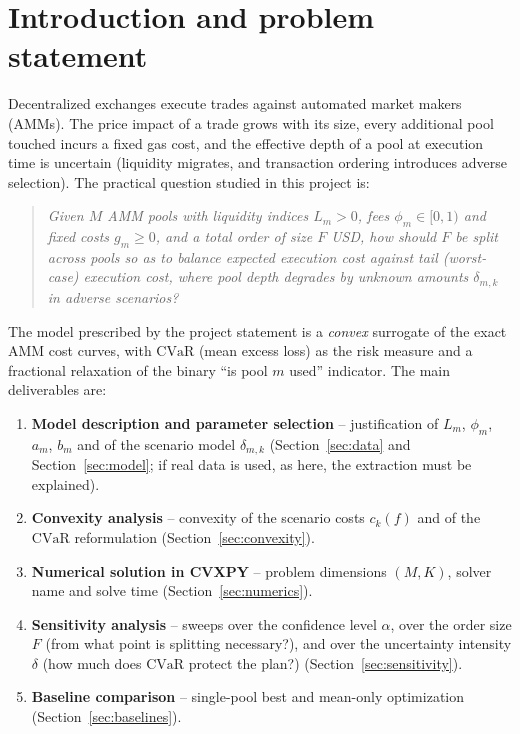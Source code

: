 \documentclass[11pt,a4paper]{article}
\theoremstyle{remark}
\newcommand{\cvar}{\texorpdfstring{\ensuremath{\mathrm{CVaR}}}{CVaR}}
\begin{document}
\tableofcontents
\newpage

\section{Introduction and problem statement}

Decentralized exchanges execute trades against automated market makers (AMMs).  The price
impact of a trade grows with its size, every additional pool touched incurs a fixed gas
cost, and the effective depth of a pool at execution time is uncertain (liquidity migrates,
and transaction ordering introduces adverse selection).  The practical question studied in
this project is:

\begin{quote}
\itshape
Given $M$ AMM pools with liquidity indices $L_m>0$, fees $\phi_m\in[0,1)$ and fixed costs
$g_m\ge 0$, and a total order of size $F$ USD, how should $F$ be split across pools so as to
balance expected execution cost against tail (worst-case) execution cost, where pool depth
degrades by unknown amounts $\delta_{m,k}$ in adverse scenarios?
\end{quote}

The model prescribed by the project statement is a \emph{convex} surrogate of the exact AMM
cost curves, with \cvar{} (mean excess loss) as the risk measure and a fractional relaxation
of the binary ``is pool $m$ used'' indicator.  The main deliverables are:

\begin{enumerate}[leftmargin=2.2em]
  \item \textbf{Model description and parameter selection} -- justification of $L_m$,
        $\phi_m$, $a_m$, $b_m$ and of the scenario model $\delta_{m,k}$ (Section~\ref{sec:data}
        and Section~\ref{sec:model}; if real data is used, as here, the extraction must be
        explained).
  \item \textbf{Convexity analysis} -- convexity of the scenario costs $c_k(f)$ and of the
        \cvar{} reformulation (Section~\ref{sec:convexity}).
  \item \textbf{Numerical solution in CVXPY} -- problem dimensions $(M,K)$, solver name and
        solve time (Section~\ref{sec:numerics}).
  \item \textbf{Sensitivity analysis} -- sweeps over the confidence level $\alpha$, over the
        order size $F$ (from what point is splitting necessary?), and over the uncertainty
        intensity $\delta$ (how much does \cvar{} protect the plan?)
        (Section~\ref{sec:sensitivity}).
  \item \textbf{Baseline comparison} -- single-pool best and mean-only optimization
        (Section~\ref{sec:baselines}).
\end{enumerate}
\end{document}
